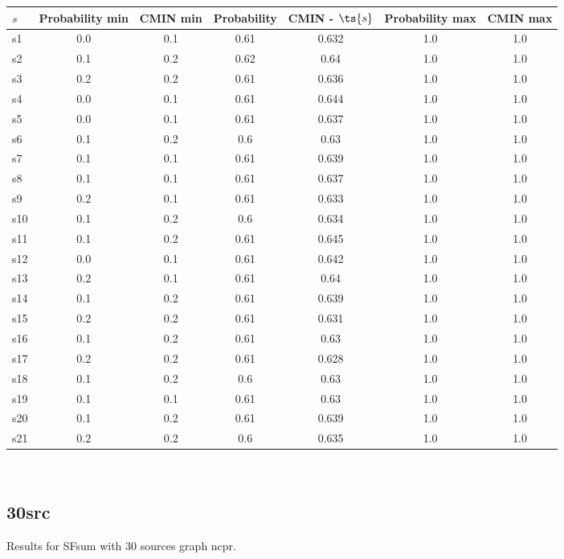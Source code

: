 \documentclass{article}
\begin{document}
\noindent\begin{tabular}{|l|c|c|c|c|c|c|}
\hline
$s$& Probability min & CMIN min & Probability & CMIN - $\ts{s}$ & Probability max & CMIN max\\
\hline
s1 &0.0 & 0.1 & 0.61 & 0.632 & 1.0 & 1.0\\
\hline
s2 &0.1 & 0.2 & 0.62 & 0.64 & 1.0 & 1.0\\
\hline
s3 &0.2 & 0.2 & 0.61 & 0.636 & 1.0 & 1.0\\
\hline
s4 &0.0 & 0.1 & 0.61 & 0.644 & 1.0 & 1.0\\
\hline
s5 &0.0 & 0.1 & 0.61 & 0.637 & 1.0 & 1.0\\
\hline
s6 &0.1 & 0.2 & 0.6 & 0.63 & 1.0 & 1.0\\
\hline
s7 &0.1 & 0.1 & 0.61 & 0.639 & 1.0 & 1.0\\
\hline
s8 &0.1 & 0.1 & 0.61 & 0.637 & 1.0 & 1.0\\
\hline
s9 &0.2 & 0.1 & 0.61 & 0.633 & 1.0 & 1.0\\
\hline
s10 &0.1 & 0.2 & 0.6 & 0.634 & 1.0 & 1.0\\
\hline
s11 &0.1 & 0.2 & 0.61 & 0.645 & 1.0 & 1.0\\
\hline
s12 &0.0 & 0.1 & 0.61 & 0.642 & 1.0 & 1.0\\
\hline
s13 &0.2 & 0.1 & 0.61 & 0.64 & 1.0 & 1.0\\
\hline
s14 &0.1 & 0.2 & 0.61 & 0.639 & 1.0 & 1.0\\
\hline
s15 &0.2 & 0.2 & 0.61 & 0.631 & 1.0 & 1.0\\
\hline
s16 &0.1 & 0.2 & 0.61 & 0.63 & 1.0 & 1.0\\
\hline
s17 &0.2 & 0.2 & 0.61 & 0.628 & 1.0 & 1.0\\
\hline
s18 &0.1 & 0.2 & 0.6 & 0.63 & 1.0 & 1.0\\
\hline
s19 &0.1 & 0.1 & 0.61 & 0.63 & 1.0 & 1.0\\
\hline
s20 &0.1 & 0.2 & 0.61 & 0.639 & 1.0 & 1.0\\
\hline
s21 &0.2 & 0.2 & 0.6 & 0.635 & 1.0 & 1.0\\
\hline
\end{tabular}\\

\newpage

\subsection{30src}

\noindent Results for SFsum with 30 sources graph ncpr.
\end{document}
